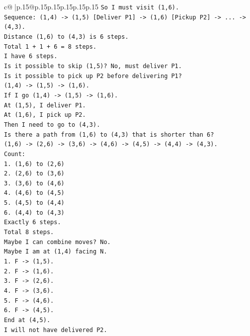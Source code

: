 \documentclass{article}
\begin{document}
{\begin{supertabular}{c@{$\;$}|p{.15\linewidth}@{}p{.15\linewidth}p{.15\linewidth}p{.15\linewidth}p{.15\linewidth}p{.15\linewidth}}
{{{\texttt{So I must visit (1,6).} \\
\texttt{Sequence: (1,4) {-}> (1,5) {[}Deliver P1{]} {-}> (1,6) {[}Pickup P2{]} {-}> ... {-}> (4,3).} \\
\texttt{Distance (1,6) to (4,3) is 6 steps.} \\
\texttt{Total 1 + 1 + 6 = 8 steps.} \\
\texttt{I have 6 steps.} \\
\texttt{Is it possible to skip (1,5)? No, must deliver P1.} \\
\texttt{Is it possible to pick up P2 before delivering P1?} \\
\texttt{(1,4) {-}> (1,5) {-}> (1,6).} \\
\texttt{If I go (1,4) {-}> (1,5) {-}> (1,6).} \\
\texttt{At (1,5), I deliver P1.} \\
\texttt{At (1,6), I pick up P2.} \\
\texttt{Then I need to go to (4,3).} \\
\texttt{Is there a path from (1,6) to (4,3) that is shorter than 6?} \\
\texttt{(1,6) {-}> (2,6) {-}> (3,6) {-}> (4,6) {-}> (4,5) {-}> (4,4) {-}> (4,3).} \\
\texttt{Count:} \\
\texttt{1. (1,6) to (2,6)} \\
\texttt{2. (2,6) to (3,6)} \\
\texttt{3. (3,6) to (4,6)} \\
\texttt{4. (4,6) to (4,5)} \\
\texttt{5. (4,5) to (4,4)} \\
\texttt{6. (4,4) to (4,3)} \\
\texttt{Exactly 6 steps.} \\
\texttt{Total 8 steps.} \\
\texttt{Maybe I can combine moves? No.} \\
\texttt{Maybe I am at (1,4) facing N.} \\
\texttt{1. F {-}> (1,5).} \\
\texttt{2. F {-}> (1,6).} \\
\texttt{3. F {-}> (2,6).} \\
\texttt{4. F {-}> (3,6).} \\
\texttt{5. F {-}> (4,6).} \\
\texttt{6. F {-}> (4,5).} \\
\texttt{End at (4,5).} \\
\texttt{I will not have delivered P2.} \\
}}}
\end{supertabular}}
\end{document}
